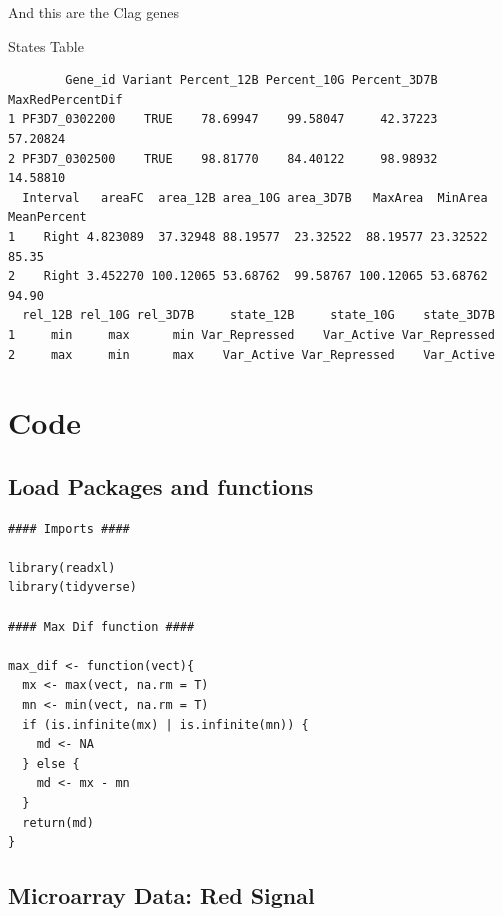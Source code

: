 \documentclass[11pt]{article}
\begin{document}
And this are the Clag genes

States Table
\begin{verbatim}
        Gene_id Variant Percent_12B Percent_10G Percent_3D7B MaxRedPercentDif
1 PF3D7_0302200    TRUE    78.69947    99.58047     42.37223         57.20824
2 PF3D7_0302500    TRUE    98.81770    84.40122     98.98932         14.58810
  Interval   areaFC  area_12B area_10G area_3D7B   MaxArea  MinArea MeanPercent
1    Right 4.823089  37.32948 88.19577  23.32522  88.19577 23.32522       85.35
2    Right 3.452270 100.12065 53.68762  99.58767 100.12065 53.68762       94.90
  rel_12B rel_10G rel_3D7B     state_12B     state_10G    state_3D7B
1     min     max      min Var_Repressed    Var_Active Var_Repressed
2     max     min      max    Var_Active Var_Repressed    Var_Active
\end{verbatim}

\section{Code}
\label{sec:orgbb87fb8}
\subsection{Load Packages and functions}
\label{sec:orgce85e72}
\begin{verbatim}
#### Imports ####

library(readxl)
library(tidyverse)

#### Max Dif function ####

max_dif <- function(vect){
  mx <- max(vect, na.rm = T)
  mn <- min(vect, na.rm = T)
  if (is.infinite(mx) | is.infinite(mn)) {
    md <- NA
  } else {
    md <- mx - mn
  }
  return(md)
}
\end{verbatim}

\subsection{Microarray Data: Red Signal}
\label{sec:org0755341}
\end{document}
